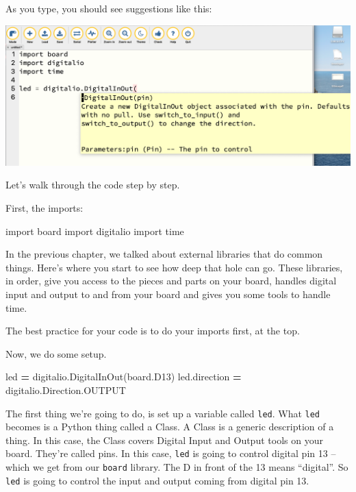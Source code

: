 \documentclass[
]{book}
\newenvironment{Shaded}{\begin{snugshade}}{\end{snugshade}}
\newcommand{\ImportTok}[1]{#1}
\newcommand{\NormalTok}[1]{#1}
\newcommand{\OperatorTok}[1]{\textcolor[rgb]{0.81,0.36,0.00}{\textbf{#1}}}
\begin{document}
As you type, you should see suggestions like this:

\includegraphics[width=1\linewidth]{images/03image2}

Let's walk through the code step by step.

First, the imports:

\begin{Shaded}
\begin{Highlighting}[]
\ImportTok{import}\NormalTok{ board}
\ImportTok{import}\NormalTok{ digitalio}
\ImportTok{import}\NormalTok{ time}
\end{Highlighting}
\end{Shaded}

In the previous chapter, we talked about external libraries that do common things. Here's where you start to see how deep that hole can go. These libraries, in order, give you access to the pieces and parts on your board, handles digital input and output to and from your board and gives you some tools to handle time.

The best practice for your code is to do your imports first, at the top.

Now, we do some setup.

\begin{Shaded}
\begin{Highlighting}[]
\NormalTok{led }\OperatorTok{=}\NormalTok{ digitalio.DigitalInOut(board.D13)}
\NormalTok{led.direction }\OperatorTok{=}\NormalTok{ digitalio.Direction.OUTPUT}
\end{Highlighting}
\end{Shaded}

The first thing we're going to do, is set up a variable called \texttt{led}. What \texttt{led} becomes is a Python thing called a Class. A Class is a generic description of a thing. In this case, the Class covers Digital Input and Output tools on your board. They're called pins. In this case, \texttt{led} is going to control digital pin 13 -- which we get from our \texttt{board} library. The D in front of the 13 means ``digital''. So \texttt{led} is going to control the input and output coming from digital pin 13.
\end{document}
